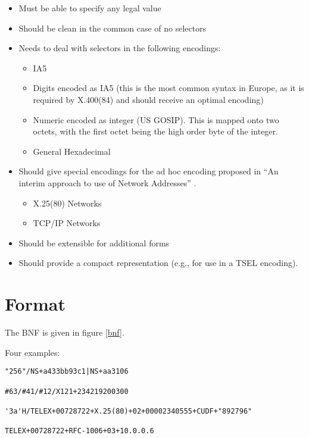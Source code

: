 \begin {itemize}
\item Must be able to specify any legal value
\item Should be clean in the common case of no selectors
\item Needs to deal with selectors in the following encodings:
\begin {itemize}
\item IA5
\item Digits encoded as IA5 (this is the most common syntax in
Europe, as it is required by X.400(84) and should receive an optimal
encoding)
\item Numeric encoded as integer (US GOSIP).  This is mapped onto two
octets, with the first octet being the high order byte of the integer.
\item General Hexadecimal
\end {itemize}

\item Should give special encodings for the ad hoc encoding proposed
in ``An interim approach to use of Network Addresses'' \cite{NSAP.Approach}.
\begin {itemize}
\item X.25(80) Networks
\item TCP/IP Networks
\end {itemize}

\item Should be extensible for additional forms

\item Should provide a compact representation (e.g., for use in a TSEL
encoding).

\end {itemize}

\section {Format}

The BNF is given in figure \ref{bnf}.


Four examples:

\begin {verbatim}
"256"/NS+a433bb93c1|NS+aa3106

#63/#41/#12/X121+234219200300

'3a'H/TELEX+00728722+X.25(80)+02+00002340555+CUDF+"892796"

TELEX+00728722+RFC-1006+03+10.0.0.6

\end{verbatim}

